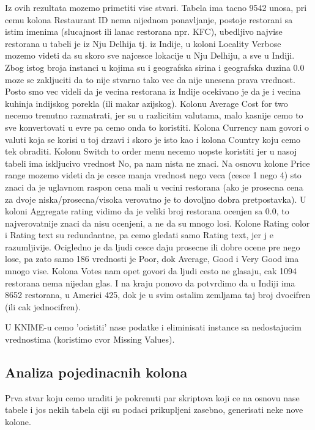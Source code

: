 \documentclass[11pt]{article} %
\begin{document}
Iz ovih rezultata mozemo primetiti vise stvari. Tabela ima tacno 9542 unosa, pri cemu kolona Restaurant ID nema nijednom ponavljanje, postoje restorani sa istim
imenima (slucajnost ili lanac restorana npr. KFC), ubedljivo najvise restorana u tabeli je iz Nju Delhija tj. iz Indije, u koloni Locality Verbose mozemo videti 
da su skoro sve najcesce lokacije u Nju Delhiju, a sve u Indiji. Zbog istog broja instanci u kojima su i geografska sirina i geografska duzina 0.0 moze 
se zakljuciti da to nije stvarno tako vec da nije unesena prava vrednost. Posto smo vec videli da je vecina restorana iz Indije ocekivano je da je i vecina kuhinja
indijskog porekla (ili makar azijskog). Kolonu Average Cost for two necemo trenutno razmatrati, jer su u razlicitim valutama, malo kasnije cemo to sve 
konvertovati u evre pa cemo onda to koristiti. Kolona Currency nam govori o valuti koja se korisi u toj drzavi i skoro je isto kao i kolona Country koju cemo 
tek obraditi. Kolonu Switch to order menu necemo uopste koristiti jer u nasoj tabeli ima iskljucivo vrednost No, pa nam nista ne znaci. Na osnovu kolone 
Price range mozemo videti da je cesce manja vrednost nego veca (cesce 1 nego 4) sto znaci da je uglavnom raspon cena mali u vecini restorana (ako je prosecna
cena za dvoje niska/prosecna/visoka verovatno je to dovoljno dobra pretpostavka). U koloni Aggregate rating vidimo da je veliki broj restorana ocenjen sa 0.0, 
to najverovatnije znaci da nisu ocenjeni, a ne da su mnogo losi. Kolone Rating color i Rating text su redundantne, pa cemo gledati samo Rating text, jer j
e razumljivije. Ocigledno je da ljudi cesce daju prosecne ili dobre ocene pre nego lose, pa zato samo 186 vrednosti je Poor, dok Average, Good i Very Good ima 
mnogo vise. Kolona Votes nam opet govori da ljudi cesto ne glasaju, cak 1094 restorana nema nijedan glas. I na kraju ponovo da potvrdimo da u Indiji ima 
8652 restorana, u Americi 425, dok je u svim ostalim zemljama taj broj dvocifren (ili cak jednocifren).

U KNIME-u cemo 'ocistiti' nase podatke i eliminisati instance sa nedostajucim vrednostima (koristimo cvor Missing Values).

\subsection{Analiza pojedinacnih kolona}
Prva stvar koju cemo uraditi je pokrenuti par skriptova koji ce na osnovu nase tabele i jos nekih tabela ciji su podaci prikupljeni zasebno, generisati neke 
nove kolone.
\end{document}

